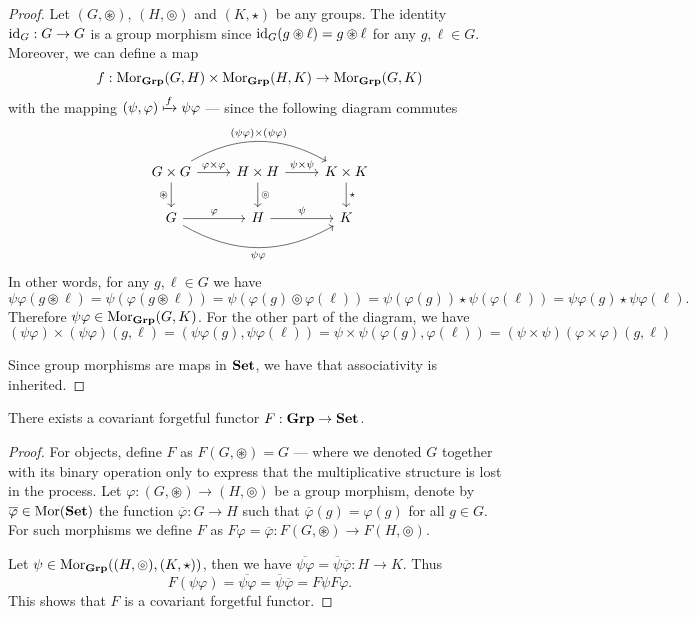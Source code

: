 \begin{proof}
Let \((G, \circledast)\), \((H, \circledcirc)\) and \((K, \star)\) be any
groups. The identity \(\operatorname{id}_G: G \to G\) is a group morphism since \(\operatorname{id}_G(g
\circledast \ell) = g \circledast \ell\) for any \(g, \ell \in G\). Moreover,
we can define a map
\[
  f: \operatorname{Mor}_{{\textbf{Grp}}}(G, H) \times \operatorname{Mor}_{{\textbf{Grp}}}(H, K) \to \operatorname{Mor}_{{\textbf{Grp}}}(G, K)
\]
with the mapping \((\psi, \varphi) \xmapsto f \psi \varphi\) --- since
the following diagram commutes
\[
  \begin{tikzcd}
    G \times G \ar[r, "\varphi \times \varphi"]
    \ar[d, swap, "\circledast"]
    \ar[rr, bend left, "(\psi \varphi) \times (\psi \varphi)"]
    &H \times H \ar[r, "\psi \times \psi"]
    \ar[d, "\circledcirc"]
    &K \times K \ar[d, "\star"]
    \\
    G \ar[r, "\varphi"]
    \ar[rr, bend right, swap, "\psi \varphi"]
    &H \ar[r, "\psi"] &K
  \end{tikzcd}
\]
In other words, for any \(g, \ell \in G\) we have
\[
  \psi \varphi (g \circledast \ell)
  = \psi(\varphi(g \circledast \ell))
  = \psi(\varphi(g) \circledcirc \varphi(\ell))
  = \psi(\varphi(g)) \star \psi(\varphi(\ell))
  = \psi \varphi(g) \star \psi \varphi(\ell).
\]
Therefore \(\psi \varphi \in \operatorname{Mor}_{\textbf{Grp}}(G, K)\). For the other part of the
diagram, we have
\[
  (\psi \varphi) \times (\psi \varphi) (g, \ell)
  = (\psi \varphi(g), \psi \varphi(\ell))
  = \psi \times \psi(\varphi(g), \varphi(\ell))
  =(\psi \times \psi) (\varphi \times \varphi) (g, \ell)
\]

Since group morphisms are maps in \({\textbf{Set}}\), we have that associativity is
inherited.
\end{proof}

\begin{proposition}\label{prop: forgetful-func-grp-set}
There exists a covariant forgetful functor \(F: {\textbf{Grp}} \to {\textbf{Set}}\).
\end{proposition}

\begin{proof}
For objects, define \(F\) as \(F(G, \circledast) = G\) --- where we denoted
\(G\) together with its binary operation only to express that the
multiplicative structure is lost in the process. Let \(\varphi: (G,
\circledast) \to (H, \circledcirc)\) be a group morphism, denote by
\(\overline \varphi \in \operatorname{Mor}({\textbf{Set}})\) the function \(\overline\varphi: G \to
H\) such that \(\overline\varphi(g) = \varphi(g)\) for all \(g \in G\). For
such morphisms we define \(F\) as \(F\varphi = \overline\varphi: F(G,
\circledast) \to F(H, \circledcirc)\).

Let \(\psi \in \operatorname{Mor}_{\textbf{Grp}}((H, \circledcirc), (K, \star))\), then we have
\(\overline{\psi \varphi} = \overline \psi \overline \varphi: H \to K\). Thus
\[
  F(\psi \varphi) = \overline{\psi \varphi}
  = \overline \psi \overline \varphi = F\psi F\varphi.
\]
This shows that \(F\) is a covariant forgetful functor.
\end{proof}

